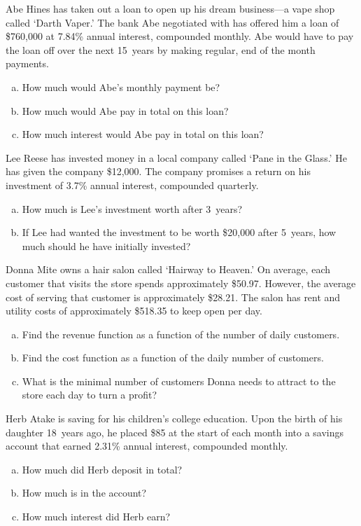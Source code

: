 \documentclass[12pt,letterpaper]{exam}
\begin{document}
\begin{questions}
\newpage
\question[10] Abe Hines has taken out a loan to open up his dream business---a vape shop called `Darth Vaper.' The bank Abe negotiated with has offered him a loan of \$760,000 at 7.84\% annual interest, compounded monthly. Abe would have to pay the loan off over the next 15~years by making regular, end of the month payments.
	\begin{enumerate}[(a)]
	\item How much would Abe's monthly payment be?
	\item How much would Abe pay in total on this loan?
	\item How much interest would Abe pay in total on this loan?
	\end{enumerate}



\newpage
\question[10] Lee Reese has invested money in a local company called `Pane in the Glass.' He has given the company \$12,000. The company promises a return on his investment of 3.7\% annual interest, compounded quarterly. 
	\begin{enumerate}[(a)]
	\item How much is Lee's investment worth after 3~years?
	\item If Lee had wanted the investment to be worth \$20,000 after 5~years, how much should he have initially invested? 
	\end{enumerate}



\newpage
\question[10] Donna Mite owns a hair salon called `Hairway to Heaven.' On average, each customer that visits the store spends approximately \$50.97. However, the average cost of serving that customer is approximately \$28.21. The salon has rent and utility costs of approximately \$518.35 to keep open per day. 
	\begin{enumerate}[(a)]
	\item Find the revenue function as a function of the number of daily customers. 
	\item Find the cost function as a function of the daily number of customers. 
	\item What is the minimal number of customers Donna needs to attract to the store each day to turn a profit? 
	\end{enumerate}



\newpage
\question[10] Herb Atake is saving for his children's college education. Upon the birth of his daughter 18~years ago, he placed \$85 at the start of each month into a savings account that earned 2.31\% annual interest, compounded monthly. 
	\begin{enumerate}[(a)]
	\item How much did Herb deposit in total?
	\item How much is in the account?
	\item How much interest did Herb earn?
	\end{enumerate}




\end{questions}
\end{document}
